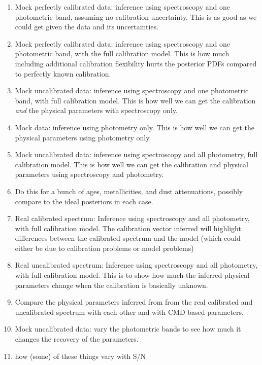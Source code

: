 \documentclass[iop,numberedappendix]{emulateapj}
\begin{document}
\begin{enumerate}

\item Mock perfectly calibrated data: inference using spectroscopy and one
  photometric band, assuming no calibration uncertainty.  This is as
  good as we could get given the data and its uncertainties.

\item Mock perfectly calibrated data: inference using spectroscopy and one
  photometric band, with the full calibration model.  This is how much
  including additional calibration flexibility hurts the posterior
  PDFs compared to perfectly known calibration.

\item Mock uncalibrated data:  inference using spectroscopy and one
  photometric band, with full calibration model.  This is how well we
  can get the calibration \emph{and} the physical parameters with
  spectroscopy only.

\item Mock data: inference using photometry only.  This is how well we
  can get the physical parameters using photometry only.

\item Mock uncalibrated data: inference using spectroscopy and all
  photometry, full calibration model.  This is how well we
  can get the calibration and physical parameters using spectroscopy
  and photometry.

\item Do this for a bunch of ages, metallicities, and dust
  attenuations, possibly compare to the ideal posteriors in each case.

\item Real calibrated spectrum:   Inference using spectroscopy and all
  photometry, with full calibration model. The calibration vector
  inferred will highlight differences between the calibrated spectrum
  and the model (which could either be due to calibration problems or
  model problems)

\item Real uncalibrated spectrum:   Inference using spectroscopy and all
  photometry, with full calibration model. This is to show how much
  the inferred physical parameters change when the calibration is
  basically unknown.

\item Compare the physical parameters inferred from from the real
  calibrated and uncalibrated spectrum with each other and with CMD
  based parameters.

\item Mock uncalibrated data:  vary the photometric bands to see how
  much it changes the recovery of the parameters.

\item how (some) of these things vary with S/N

\end{enumerate}
\end{document}
